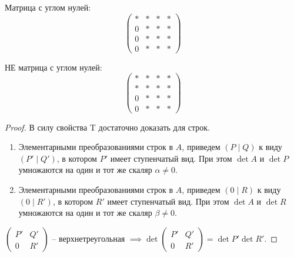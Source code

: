 \documentclass[a4paper]{article}
\begin{document}
\begin{colloq}
            Матрица с углом нулей:
            \begin{equation*}
                \left(
                    \begin{array}{c|ccc}
                        * & * & * & * \\
                        \hline
                        0 & * & * & * \\
                        0 & * & * & * \\
                        0 & * & * & *
                    \end{array}
                \right)
            \end{equation*}

            НЕ матрица с углом нулей:
            \begin{equation*}
                \left(
                    \begin{array}{c|ccc}
                        * & * & * & * \\
                        * & * & * & * \\
                        \hline
                        0 & * & * & * \\
                        0 & * & * & *
                    \end{array}
                \right)
            \end{equation*}

            \begin{proof}
                В силу свойства T достаточно доказать для строк.

                \begin{enumerate}
                \item
                    Элементарными преобразованиями строк в $A$, приведем $(P \mid Q)$ к виду $(P' \mid Q')$, в котором $P'$ имеет ступенчатый вид. При этом $\det A$ и $\det P$ умножаются на один и тот же скаляр $\alpha \neq 0$.

                \item
                    Элементарными преобразованиями строк в $A$, приведем $(0 \mid R)$ к виду $(0 \mid R')$, в котором $R'$ имеет ступенчатый вид. При этом $\det A$ и $\det R$ умножаются на один и тот же скаляр $\beta \neq 0$.
                \end{enumerate}

                $\begin{pmatrix} P' & Q' \\ 0 & R' \end{pmatrix} $ -- верхнетреугольная $\implies \det \begin{pmatrix} P' & Q' \\ 0 & R' \end{pmatrix} = \det P' \det R'$.


\end{proof}
\end{colloq}
\end{document}
